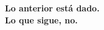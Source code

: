 \documentclass[aspectratio=169,11pt]{beamer}
\begin{document}

\begin{frame}[plain]
  \vfill
  \begin{center}
    \colorbox{banda}{\parbox{0.86\textwidth}{\vspace{1.2em}\centering
      \Large\textbf{\textcolor{acento}{Lo anterior está dado.}}\\[0.5em]
      \Large\textbf{\textcolor{acento}{Lo que sigue, no.}}
      \vspace{1.2em}}}
  \end{center}
  \vfill
\end{frame}
\end{document}
